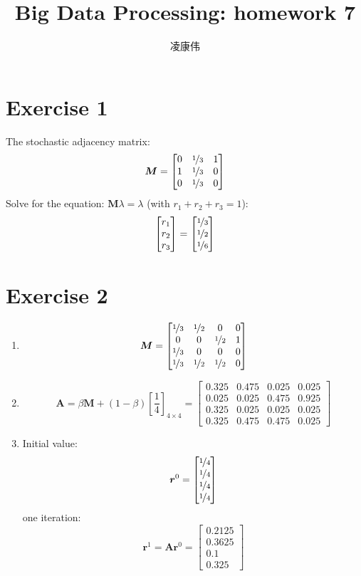 \documentclass[11pt]{article}
\title{Big Data Processing: homework 7}
\author{凌康伟 \qquad 5140219295}
\newcommand{\bA}{ \bm{A} }
\newcommand{\bM}{ \bm{M} }
\newcommand{\br}{ \bm{r} }
\newcommand{\onef}[1]{ \nicefrac{1}{#1} }
\begin{document}
\maketitle

\section*{Exercise 1}
The stochastic adjacency matrix:
\[
  \bM =
  \begin{bmatrix}
    0 & \onef{3} & 1 \\
    1 & \onef{3} & 0 \\
    0 & \onef{3} & 0
  \end{bmatrix}
\]
Solve for the equation: $\bM \lambda = \lambda$ (with $r_1 + r_2 + r_3 = 1$):
\[
  \begin{bmatrix}
    r_1 \\ r_2 \\ r_3
  \end{bmatrix}
  =
  \begin{bmatrix}
    \onef{3} \\ \onef{2} \\ \onef{6}
  \end{bmatrix}
\]

\section*{Exercise 2}
\begin{enumerate}[1.]
\item
  \[
    \bM =
    \begin{bmatrix}
      \onef{3} & \onef{2} & 0        & 0\\
      0        & 0        & \onef{2} & 1\\
      \onef{3} & 0        & 0        & 0\\
      \onef{3} & \onef{2} & \onef{2} & 0
    \end{bmatrix}
  \]
\item
  \[
    \bA = \beta \bM + (1 - \beta)[\dfrac{1}{4}]_{4\times 4} =
    \begin{bmatrix}
      0.325 & 0.475 & 0.025 & 0.025\\
      0.025 & 0.025 & 0.475 & 0.925\\
      0.325 & 0.025 & 0.025 & 0.025\\
      0.325 & 0.475 & 0.475 & 0.025
    \end{bmatrix}
  \]
\item Initial value:
  \[
    \br^0 =
    \begin{bmatrix}
      \onef{4} \\ \onef{4} \\ \onef{4} \\ \onef{4}
    \end{bmatrix}
  \]
  one iteration:
  \[
    \br^1 = \bA \br^0 =
    \begin{bmatrix}
      0.2125 \\ 0.3625 \\ 0.1 \\ 0.325
    \end{bmatrix}
  \]
\end{enumerate}
\end{document}
